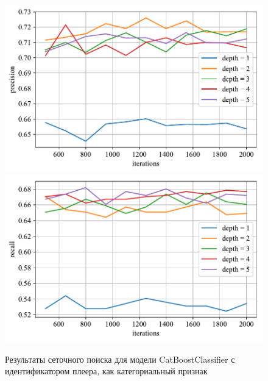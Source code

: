\begin{figure}
    \centering
    \includegraphics{./images/toloka_catboost_with_cat_precision.pdf}
    \includegraphics{./images/toloka_catboost_with_cat_recall.pdf}
    \caption{Результаты сеточного поиска для модели CatBoostClassifier с идентификатором плеера, как категориальный признак}
    \label{fig:toloka_catboost_with_cat}
\end{figure}